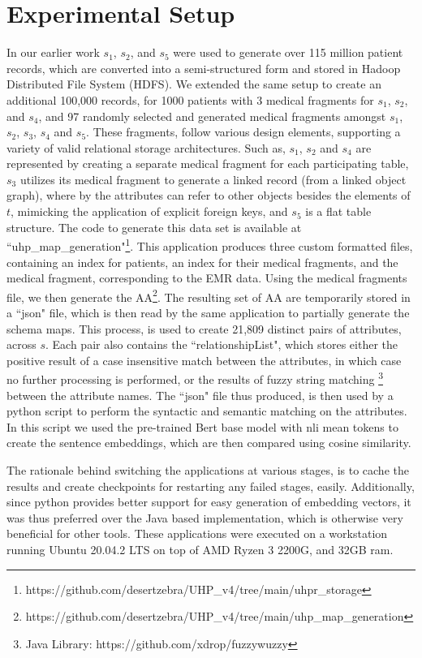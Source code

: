 
\section*{Experimental Setup}
\label{experimentalSetup}
In our earlier work \cite{Satti2020} $s_1$, $s_2$, and $s_5$ were used to generate over 115 million patient records, which are converted into a semi-structured form and stored in Hadoop Distributed File System (HDFS). We extended the same setup to create an additional 100,000 records, for 1000 patients with 3 medical fragments for $s_1$, $s_2$, and $s_4$, and 97 randomly selected and generated medical fragments amongst $s_1$, $s_2$, $s_3$, $s_4$ and $s_5$. These fragments, follow various design elements, supporting a variety of valid relational storage architectures. Such as, $s_1$, $s_2$ and $s_4$ are represented by creating a separate medical fragment for each participating table, $s_3$ utilizes its medical fragment to generate a linked record (from a linked object graph), where by the attributes can refer to other objects besides the elements of $t$, mimicking the application of explicit foreign keys, and $s_5$ is a flat table structure. The code to generate this data set is available at ``uhp\_map\_generation"\footnote{https://github.com/desertzebra/UHP\_v4/tree/main/uhpr\_storage}. This application produces three custom formatted files, containing an index for patients, an index for their medical fragments, and the medical fragment, corresponding to the EMR data. Using the medical fragments file, we then generate the AA\footnote{https://github.com/desertzebra/UHP\_v4/tree/main/uhp\_map\_generation}. The resulting set of AA are temporarily stored in a ``json" file, which is then read by the same application to partially generate the schema maps. This process, is used to create 21,809  distinct pairs of attributes, across $s$. Each pair also contains the ``relationshipList", which stores either the positive result of a case insensitive match between the attributes, in which case no further processing is performed, or the results of fuzzy string matching\cite{FuzzyWuzzy} \footnote{Java Library: https://github.com/xdrop/fuzzywuzzy} between the attribute names. 
The ``json" file thus produced, is then used by a python script to perform the syntactic and semantic matching on the attributes. In this script we used the pre-trained Bert base model with nli mean tokens\cite{reimers-2019-sentence-bert} to create the sentence embeddings, which are then compared using cosine similarity. 

The rationale behind switching the applications at various stages, is to cache the results and create checkpoints for restarting any failed stages, easily. Additionally, since python provides better support for easy generation of embedding vectors, it was thus preferred over the Java based implementation, which is otherwise very beneficial for other tools. These applications were executed on a workstation running Ubuntu 20.04.2 LTS on top of AMD Ryzen 3 2200G, and 32GB ram.

